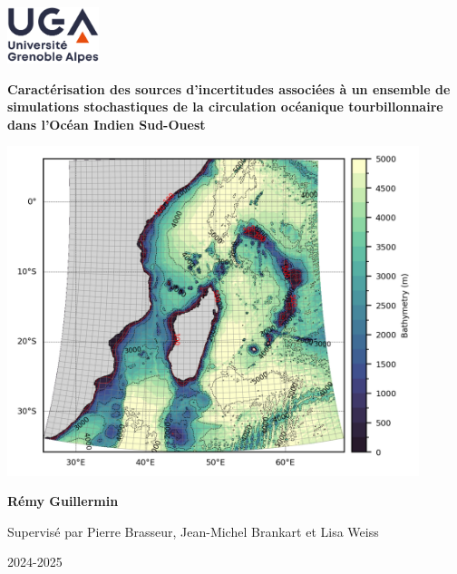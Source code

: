 \documentclass[final,5p,times,twocolumn,authoryear]{report}
\begin{document}
\begin{titlepage}
   \begin{center}
   		\includegraphics[width=0.2\textwidth]{UGA-logo}
   		
       \vspace*{1cm}

       \textbf{Caractérisation des sources d'incertitudes associées à un ensemble de simulations stochastiques de la circulation océanique
tourbillonnaire dans l'Océan Indien Sud-Ouest}
                    
       \vfill
       
       \includegraphics[width=0.9\textwidth]{figures/bathy_iso_swio2_grid.png} 
       
       \vfill
       
       \textbf{Rémy Guillermin}
       
       \vspace{0.5cm}
        Supervisé par Pierre Brasseur, Jean-Michel Brankart et Lisa Weiss
            
       \vspace{0.8cm}

       2024-2025
            
   \end{center}
\end{titlepage}
\end{document}
